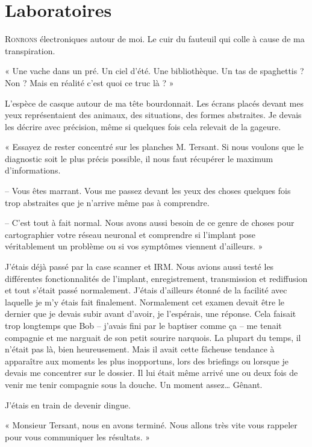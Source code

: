 \chapter{Laboratoires}

\lettrine{R}{onrons} électroniques autour de moi. Le cuir du fauteuil qui colle à cause de ma transpiration.

« Une vache dans un pré. Un ciel d'été. Une bibliothèque. Un tas de spaghettis ? Non ? Mais en réalité 
c'est quoi ce
truc là ? »

L'espèce de casque autour de ma tête bourdonnait. Les écrans placés devant mes yeux représentaient des animaux, des 
situations, des formes abstraites. Je devais les décrire avec précision, même si quelques fois cela relevait de la
gageure.

« Essayez de rester concentré sur les planches M. Tersant. Si nous voulons que le diagnostic soit le plus précis
possible, il nous faut récupérer le maximum d'informations.

-- Vous êtes marrant. Vous me passez devant les yeux des choses quelques fois trop abstraites que je n'arrive même pas à
comprendre.

-- C'est tout à fait normal. Nous avons aussi besoin de ce genre de choses pour cartographier votre réseau neuronal et
comprendre si l'implant pose véritablement un problème ou si vos symptômes viennent d'ailleurs. »

J'étais déjà passé par la case scanner et IRM. Nous avions aussi testé les différentes fonctionnalités de l'implant,
enregistrement, transmission et rediffusion et tout s'était passé normalement. J'étais d'ailleurs étonné de la facilité
avec laquelle je m'y étais fait finalement. Normalement cet examen devait être le dernier que je devais subir avant 
d'avoir, je l'espérais, une réponse. Cela faisait trop longtemps que Bob -- j'avais fini par le baptiser comme ça -- me
tenait compagnie et me narguait de son petit sourire narquois. La plupart du temps, il n'était pas là, bien 
heureusement. Mais il avait cette fâcheuse tendance à apparaître aux moments les plus inopportuns, lors des briefings 
ou lorsque je devais me concentrer sur le dossier. Il lui était même arrivé une ou deux fois de venir me tenir 
compagnie sous la douche. Un moment assez… Gênant.

J'étais en train de devenir dingue.

« Monsieur Tersant, nous en avons terminé. Nous allons très vite vous rappeler pour vous communiquer les résultats. »

